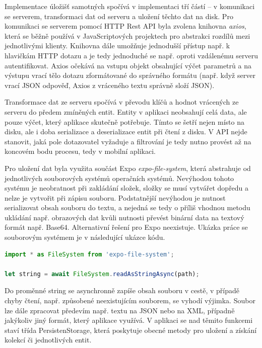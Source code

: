 Implementace úložišť samotných spočívá v implementaci tří částí -- v komunikaci se serverem, transformaci dat od serveru a uložení těchto dat na disk. Pro komunikaci se serverem pomocí HTTP Rest API byla zvolena knihovna \emph{axios}, která se běžně používá v JavaScriptových projektech pro abstrakci rozdílů mezi jednotlivými klienty. Knihovna dále umožňuje jednodušší přístup např. k hlavičkám HTTP dotazu a je tedy jednoduché se např. oproti vzdálenému serveru autentifikovat. Axios očekává na vstupu objekt obsahující výčet parametrů a na výstupu vrací tělo dotazu zformátované do správného formátu (např. když server vrací JSON odpověď, Axios z vráceného textu správně složí JSON).

Transformace dat ze serveru spočívá v převodu klíčů a hodnot vrácených ze serveru do předem zmíněných entit. Entity v aplikaci neobsahují celá data, ale pouze výčet, který aplikace skutečně potřebuje. Tímto se šetří nejen místo na disku, ale i doba serializace a deserializace entit při čtení z disku. V API nejde stanovit, jaká pole dotazovatel vyžaduje a filtrování je tedy nutno provést až na koncovém bodu procesu, tedy v mobilní aplikaci.

Pro uložení dat byla využita součást Expo \emph{expo-file-system}, která abstrahuje od jednotlivých souborových systémů operačních systémů. Nevýhodou tohoto systému je neobratnost při zakládání složek, složky se musí vytvářet dopředu a nelze je vytvořit při zápisu souboru. Podstatnější nevýhodou je nutnost serializovat obsah souboru do textu, a nejedná se tedy o příliš vhodnou metodu ukládání např. obrazových dat kvůli nutnosti převést binární data na textový formát např. Base64. Alternativní řešení pro Expo neexistuje. Ukázka práce se souborovým systémem je v následující ukázce kódu.

\begin{lstlisting}[language=JavaScript, caption=Ukázka entity]
import * as FileSystem from 'expo-file-system';

let string = await FileSystem.readAsStringAsync(path);
\end{lstlisting}

Do proměnné string se asynchronně zapíše obsah souboru v cestě, v případě chyby čtení, např. způsobené neexistujícím souborem, se vyhodí výjimka. Soubor lze dále zpracovat předevím např. textu na JSON nebo na XML, případně jakýkoliv jiný formát, který aplikace využívá. V aplikaci se nad těmito funkcemi staví třída PersistenStorage, která poskytuje obecné metody pro uložení a získání kolekcí či jednotlivých entit.

